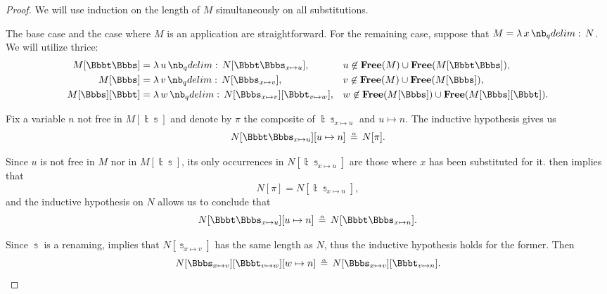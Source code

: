 \begin{proof}
  We will use induction on the length of \( M \) simultaneously on all substitutions.

  The base case and the case where \( M \) is an application are straightforward. For the remaining case, suppose that \( M = \qabs x N \). We will utilize  thrice:
  \begin{align*}
    M[\Bbbt\Bbbs]   &= \qabs u N[\Bbbt\Bbbs_{x \mapsto u}],                 &&u \not\in \op*{Free}(M) \cup \op*{Free}(M[\Bbbt\Bbbs]), \\
    M[\Bbbs]        &= \qabs v N[\Bbbs_{x \mapsto v}],                      &&v \not\in \op*{Free}(M) \cup \op*{Free}(M[\Bbbs]), \\
    M[\Bbbs][\Bbbt] &= \qabs w N[\Bbbs_{x \mapsto v}][\Bbbt_{v \mapsto w}], &&w \not\in \op*{Free}(M[\Bbbs]) \cup \op*{Free}(M[\Bbbs][\Bbbt]).
  \end{align*}

  Fix a variable \( n \) not free in \( M[\Bbbt\Bbbs] \) and denote by \( \pi \) the composite of \( \Bbbt\Bbbs_{x \mapsto u} \) and \( u \mapsto n \). The inductive hypothesis gives us
  \begin{equation*}
    N[\Bbbt\Bbbs_{x \mapsto u}][u \mapsto n] \aequiv N[\pi].
  \end{equation*}

  Since \( u \) is not free in \( M \) nor in \( M[\Bbbt\Bbbs] \), its only occurrences in \( N[\Bbbt\Bbbs_{x \mapsto u}] \) are those where \( x \) has been substituted for it.  then implies that
  \begin{equation*}
    N[\pi] = N[\Bbbt\Bbbs_{x \mapsto n}],
  \end{equation*}
  and the inductive hypothesis on \( N \) allows us to conclude that
  \begin{equation}\label{eq:thm:renaming_composition_is_alpha_equivalent/proof/composite}
    N[\Bbbt\Bbbs_{x \mapsto u}][u \mapsto n] \aequiv N[\Bbbt\Bbbs_{x \mapsto n}].
  \end{equation}

  Since \( \Bbbs \) is a renaming,  implies that \( N[\Bbbs_{x \mapsto v}] \) has the same length as \( N \), thus the inductive hypothesis holds for the former. Then
  \begin{equation*}
    N[\Bbbs_{x \mapsto v}][\Bbbt_{v \mapsto w}][w \mapsto n] \aequiv N[\Bbbs_{x \mapsto v}][\Bbbt_{v \mapsto n}].
  \end{equation*}


\end{proof}

